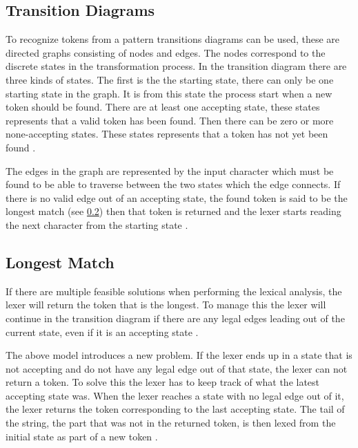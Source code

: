 \subsection{Transition Diagrams}
To recognize tokens from a pattern transitions diagrams can be used, these are
directed graphs consisting of nodes and edges. The nodes correspond to the
discrete states in the transformation process. In the transition diagram there
are three kinds of states. The first is the the starting state, there can only
be one starting state in the graph. It is from this state the process start when
a new token should be found. There are at least one accepting state, these states
represents that a valid token has been found. Then there can be zero or more
none-accepting states. These states represents that a token has not yet been
found \cite{Aho2006}.

The edges in the graph are represented by the input character which must be
found to be able to traverse between the two states which the edge connects. If
there is no valid edge out of an accepting state, the found token is said to be
the longest match (see \cref{sub:longmatch}) then that token is returned and the
lexer starts reading the next character from the starting state \cite{Aho2006}.

\subsection{Longest Match}\label{sub:longmatch}
If there are multiple feasible solutions when performing the lexical
analysis, the lexer will return the token that is the longest. To manage this
the lexer will continue in the transition diagram if there are any legal edges
leading out of the current state, even if it is an accepting state \cite{Aho2006}.

The above model introduces a new problem. If the lexer ends up in a state that
is not accepting and do not have any legal edge out of that state, the lexer
can not return a token. To solve this the lexer has to keep track of what the
latest accepting state was. When the lexer reaches a state with no
legal edge out of it, the lexer returns the token corresponding to the last
accepting state. The tail of the string, the part that was not in the returned
token, is then lexed from the initial state as part of a new token
\cite{Aho2006}.

